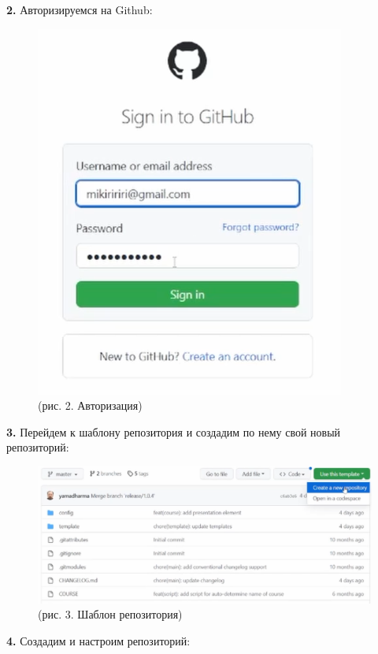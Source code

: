 \documentclass[
  12pt,
  a4paper,
]{scrreprt}
\begin{document}
\textbf{2.} Авторизируемся на Github:

\begin{figure}
\centering
\includegraphics{./tex2pdf.-cbf55669a78d292a/image/2.PNG}
\caption{(рис. 2. Авторизация)}
\end{figure}

\textbf{3.} Перейдем к шаблону репозитория и создадим по нему свой новый
репозиторий:

\begin{figure}
\centering
\includegraphics{./tex2pdf.-cbf55669a78d292a/image/3.PNG}
\caption{(рис. 3. Шаблон репозитория)}
\end{figure}

\textbf{4.} Создадим и настроим репозиторий:
\end{document}
